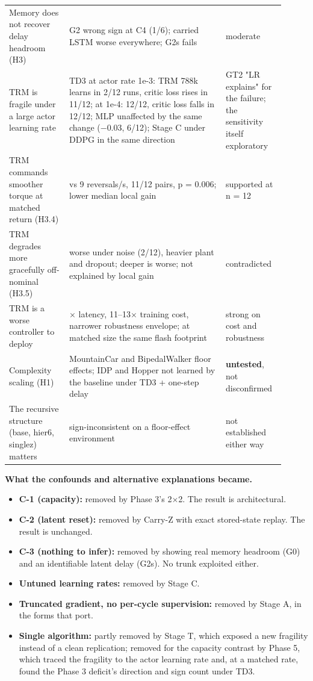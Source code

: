 \documentclass[11pt]{article}
\begin{document}
\begin{center}
\begin{tabular}{>{\raggedright\arraybackslash}p{0.204\linewidth}>{\raggedright\arraybackslash}p{0.521\linewidth}>{\raggedright\arraybackslash}p{0.181\linewidth}}
Memory does not recover delay headroom (H3) & G2 wrong sign at C4 (1/6); carried LSTM worse everywhere; G2s fails & moderate \\
TRM is fragile under a large actor learning rate & TD3 at actor rate 1e-3: TRM 788k learns in 2/12 runs, critic loss rises in 11/12; at 1e-4: 12/12, critic loss falls in 12/12; MLP unaffected by the same change ($-$0.03, 6/12); Stage C under DDPG in the same direction & GT2 "LR explains" for the failure; the sensitivity itself exploratory \\
TRM commands smoother torque at matched return (H3.4) & 0.4 vs 9 reversals/s, 11/12 pairs, p = 0.006; lower median local gain & supported at n = 12 \\
TRM degrades more gracefully off-nominal (H3.5) & worse under noise (2/12), heavier plant and dropout; deeper is worse; not explained by local gain & contradicted \\
TRM is a worse controller to deploy & 65$\times$ latency, 11--13$\times$ training cost, narrower robustness envelope; at matched size the same flash footprint & strong on cost and robustness \\
Complexity scaling (H1) & MountainCar and BipedalWalker floor effects; IDP and Hopper not learned by the baseline under TD3 + one-step delay & \textbf{untested}, not disconfirmed \\
The recursive structure (base, hier6, singlez) matters & sign-inconsistent on a floor-effect environment & not established either way \\
\bottomrule
\end{tabular}\end{center}



\textbf{What the confounds and alternative explanations became.}

\begin{itemize}
\item \textbf{C-1 (capacity):} removed by Phase 3's 2$\times$2. The result is architectural.
\item \textbf{C-2 (latent reset):} removed by Carry-Z with exact stored-state replay. The result is unchanged.
\item \textbf{C-3 (nothing to infer):} removed by showing real memory headroom (G0) and an identifiable latent delay (G2s). No trunk exploited either.
\item \textbf{Untuned learning rates:} removed by Stage C.
\item \textbf{Truncated gradient, no per-cycle supervision:} removed by Stage A, in the forms that port.
\item \textbf{Single algorithm:} partly removed by Stage T, which exposed a new fragility instead of a clean replication; removed for the capacity contrast by Phase 5, which traced the fragility to the actor learning rate and, at a matched rate, found the Phase 3 deficit's direction and sign count under TD3.
\end{itemize}
\end{document}
